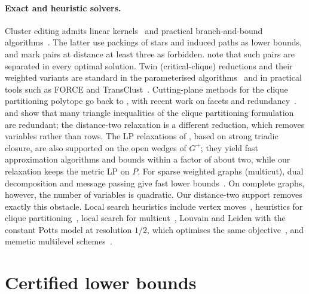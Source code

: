 \documentclass[11pt]{article}
\theoremstyle{definition}
\begin{document}
\paragraph{Exact and heuristic solvers.}  Cluster editing admits linear
kernels~\citep{Guo09kernel,CaoC12kernel} and practical branch-and-bound
algorithms~\citep{BockerBK11exact,BlasiusEtAl22sea}.  The latter use packings
of stars and induced paths as lower bounds, and mark pairs at distance at
least three as forbidden.  \citet{BastosOPSMP16} note that such pairs are
separated in every optimal solution.  Twin (critical-clique) reductions and
their weighted variants are standard in the parameterised
algorithms~\citep{Guo09kernel,ProttiDS09modular,BockerBBT09weighted,
Bocker12golden,ChenM12kernel} and in practical tools such as FORCE and
TransClust~\citep{WittkopBLR07force,WittkopEtAl10transclust}.  Cutting-plane
methods for the clique partitioning polytope go back to
\citet{GrotschelW89,GrotschelW90facets}, with recent work on facets and
redundancy~\citep{irmai2024chorded,koshimura2022concise}.
\citet{MiyauchiS15redundant} and \citet{miyauchi2018exact} show that many
triangle inequalities of the clique partitioning formulation are redundant;
the distance-two relaxation is a different reduction, which removes
variables rather than rows.  The LP relaxations of \citet{veldt2022stc}, based
on strong triadic closure, are also supported on the open wedges of $G^+$;
they yield fast approximation algorithms and bounds within a factor of about
two, while our relaxation keeps the metric LP on $P$.  For
sparse weighted graphs (multicut), dual decomposition and message passing
give fast lower bounds~\citep{SwobodaA17multicut,AbbasS22rama,lange2018partial}.
On complete graphs, however, the number of variables is quadratic.  Our
distance-two support removes exactly this obstacle.  Local search heuristics
include vertex moves~\citep{elsner2009bounding}, heuristics for clique
partitioning~\citep{BruscoK09clique,ZhouHG16threephase,LuZH22hybrid}, local
search for multicut~\citep{levinkov2017comparative}, Louvain and Leiden with the
constant Potts model at resolution $1/2$, which optimises the same
objective~\citep{veldt2018lambdacc,BlondelGLL08,TraagWvE19}, and memetic
multilevel schemes~\citep{hausberger2025scc,BlasiusEtAl21kapoceHeur}.

\section{Certified lower bounds}\label{sec:bounds}
\end{document}

